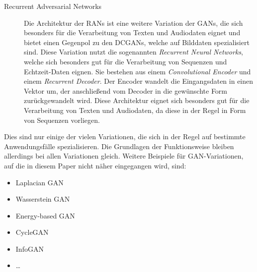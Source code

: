 \begin{description}
    \item[Recurrent Adversarial Networks] Die Architektur der \acp{RAN} ist eine weitere Variation der \acp{GAN}, die sich besonders für die Verarbeitung von Texten und Audiodaten eignet und bietet einen Gegenpol zu den \acp{DCGAN}, welche auf Bilddaten spezialisiert sind. Diese Variation nutzt die sogenannten \textit{Recurrent Neural Networks}, welche sich besonders gut für die Verarbeitung von Sequenzen und Echtzeit-Daten eignen. Sie bestehen aus einem \textit{Convolutional Encoder} und einem \textit{Recurrent Decoder}. Der Encoder wandelt die Eingangsdaten in einen Vektor um, der anschließend vom Decoder in die gewünschte Form zurückgewandelt wird. Diese Architektur eignet sich besonders gut für die Verarbeitung von Texten und Audiodaten, da diese in der Regel in Form von Sequenzen vorliegen. \\

\end{description}

\noindent Dies sind nur einige der vielen Variationen, die sich in der Regel auf bestimmte Anwendungsfälle spezialisieren. Die Grundlagen der Funktionsweise bleiben allerdings bei allen Variationen gleich. Weitere Beispiele für \ac{GAN}-Variationen, auf die in diesem Paper nicht näher eingegangen wird, sind: \\

\begin{itemize}
    \item Laplacian GAN
    \item Wasserstein GAN
    \item Energy-based GAN
    \item CycleGAN
    \item InfoGAN
    \item \ldots
\end{itemize}
    

\newpage
